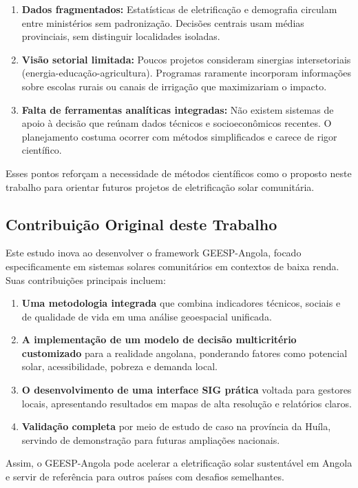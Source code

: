 \documentclass[12pt, a4paper]{article}
\begin{document}
\begin{enumerate}
\item \textbf{Dados fragmentados:} Estatísticas de eletrificação e demografia circulam entre ministérios sem padronização. Decisões centrais usam médias provinciais, sem distinguir localidades isoladas.
\item \textbf{Visão setorial limitada:} Poucos projetos consideram sinergias intersetoriais (energia-educação-agricultura). Programas raramente incorporam informações sobre escolas rurais ou canais de irrigação que maximizariam o impacto.
\item \textbf{Falta de ferramentas analíticas integradas:} Não existem sistemas de apoio à decisão que reúnam dados técnicos e socioeconômicos recentes. O planejamento costuma ocorrer com métodos simplificados e carece de rigor científico.
\end{enumerate}

Esses pontos reforçam a necessidade de métodos científicos como o proposto neste trabalho para orientar futuros projetos de eletrificação solar comunitária.

\subsection{Contribuição Original deste Trabalho}

Este estudo inova ao desenvolver o framework GEESP-Angola, focado especificamente em sistemas solares comunitários em contextos de baixa renda. Suas contribuições principais incluem:

\begin{enumerate}
\item \textbf{Uma metodologia integrada} que combina indicadores técnicos, sociais e de qualidade de vida em uma análise geoespacial unificada.
\item \textbf{A implementação de um modelo de decisão multicritério customizado} para a realidade angolana, ponderando fatores como potencial solar, acessibilidade, pobreza e demanda local.
\item \textbf{O desenvolvimento de uma interface SIG prática} voltada para gestores locais, apresentando resultados em mapas de alta resolução e relatórios claros.
\item \textbf{Validação completa} por meio de estudo de caso na província da Huíla, servindo de demonstração para futuras ampliações nacionais.
\end{enumerate}

Assim, o GEESP-Angola pode acelerar a eletrificação solar sustentável em Angola e servir de referência para outros países com desafios semelhantes.
\end{document}
